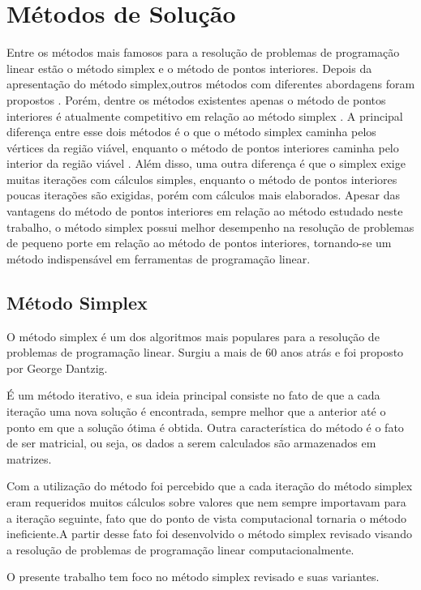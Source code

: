 \section{Métodos de Solução}
Entre os métodos mais famosos para a resolução de problemas de programação linear estão o método simplex  e o método de pontos interiores.
Depois da apresentação do método simplex,outros métodos com diferentes abordagens foram propostos \cite{Todd}. Porém, dentre os métodos existentes apenas o método de pontos interiores é atualmente competitivo em relação ao método simplex .
A principal diferença entre esse dois métodos é o que o método simplex caminha pelos vértices da região viável, enquanto o método de pontos interiores caminha pelo interior da região viável \cite{MaculanPI}. Além disso, uma outra diferença é que o simplex exige muitas iterações com cálculos simples, enquanto o método de pontos interiores poucas iterações são exigidas, porém com cálculos mais elaborados.
Apesar das vantagens do método de pontos interiores em relação ao método estudado neste trabalho, o método simplex possui melhor desempenho na resolução de problemas de pequeno porte em relação ao método de pontos interiores, tornando-se um método indispensável em ferramentas de programação linear.

\subsection{Método Simplex}
O método simplex é um dos algoritmos mais populares para a resolução de problemas de programação linear. Surgiu a mais de 60 anos atrás e foi proposto por George Dantzig.

É um método iterativo, e sua ideia principal consiste no fato de que a cada iteração uma nova solução é encontrada, sempre melhor que a anterior até o ponto em que a solução ótima é obtida. Outra característica do método é o fato de ser matricial, ou seja, os dados a serem calculados são armazenados em matrizes.

Com a utilização do método foi percebido que a cada iteração do método simplex eram requeridos muitos cálculos sobre valores que nem sempre importavam para a iteração seguinte, fato que do ponto de vista computacional tornaria o método ineficiente.A partir desse fato foi desenvolvido o método simplex revisado visando a resolução de problemas de programação linear computacionalmente.

O presente trabalho tem foco no método simplex revisado e suas variantes.

